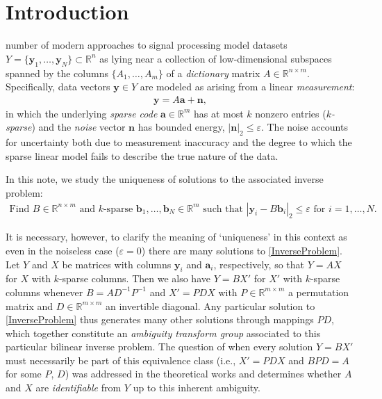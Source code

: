 \documentclass[journal, onecolumn]{IEEEtran}
\begin{document}
\section{Introduction}
 number of modern approaches to signal processing model datasets $Y = \{\mathbf{y}_1, \ldots, \mathbf{y}_N\} \subset \mathbb{R}^n$ as lying near a collection of low-dimensional subspaces spanned by the columns $\{A_1,\ldots,A_m\}$ of a \textit{dictionary} matrix $A \in \mathbb R^{n\times m}$.  Specifically, data vectors $\mathbf{y} \in Y$ are modeled as arising from a linear \emph{measurement}:
\begin{align}\label{LinearModel}
\mathbf{y} = A\mathbf{a} + \mathbf{n},
\end{align}
in which the underlying \emph{sparse code} $\mathbf{a} \in \mathbb{R}^{m}$ has at most $k$ nonzero entries (\textit{$k$-sparse}) and the \emph{noise} vector $\mathbf{n}$ has bounded energy, $|\mathbf{n}|_2 \leq \varepsilon$. 
The noise accounts for uncertainty both due to measurement inaccuracy and the degree to which the sparse linear model fails to describe the true nature of the data.

In this note, we study the uniqueness of solutions to the associated inverse problem:
\begin{align}\label{InverseProblem}
\text{Find $B \in \mathbb{R}^{n \times m}$ and $k$-sparse $\mathbf{b}_1, \ldots, \mathbf{b}_N \in \mathbb{R}^m$ such that $|\mathbf{y}_i - B\mathbf{b}_i|_2 \leq \varepsilon$ for $i = 1, \ldots, N$.}
\end{align}

It is necessary, however, to clarify the meaning of `uniqueness' in this context as even in the noiseless case ($\varepsilon = 0$) there are many solutions to \eqref{InverseProblem}. Let $Y$ and $X$ be matrices with columns $\mathbf{y}_i$ and $\mathbf{a}_i$, respectively, so that $Y = AX$ for $X$ with $k$-sparse columns. Then we also have $Y = BX'$ for $X'$ with $k$-sparse columns whenever $B = AD^{-1}P^{-1}$ and $X' = PDX$ with $P \in \mathbb{R}^{m \times m}$ a permutation matrix  and $D \in \mathbb{R}^{m \times m}$ an invertible diagonal. Any particular solution to \eqref{InverseProblem} thus generates many other solutions through mappings $PD$, which together constitute an \emph{ambiguity transform group} \cite{BilinInv} associated to this particular bilinear inverse problem. The question of when every solution $Y = BX'$ must necessarily be part of this equivalence class (i.e., $X' = PDX$ and $BPD = A$ for some $P$, $D$) was addressed in the theoretical works \cite{Georgiev05, Aharon06, Hillar15} and determines whether $A$ and $X$ are \emph{identifiable} from $Y$ up to this inherent ambiguity. 
\end{document}
